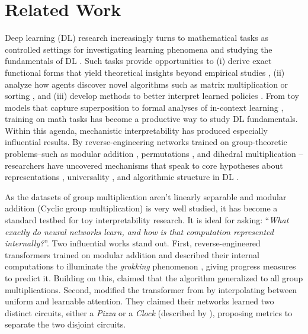 \documentclass{article} %
\theoremstyle{plain}
\theoremstyle{definition}
\newtheorem{empirical fact}[theorem]{Empirical Fact}
\begin{document}
\section{Related Work}
Deep learning (DL) research increasingly turns to mathematical tasks as controlled settings for investigating learning phenomena and studying the fundamentals of DL \citep{ghosh2025mathematical}. Such tasks provide opportunities to (i) derive exact functional forms that yield theoretical insights beyond empirical studies \citep{mccracken2021using}, (ii) analyze how agents discover novel algorithms such as matrix multiplication or sorting \citep{fawzi2022discovering, mankowitz2023faster}, and (iii) develop methods to better interpret learned policies \citep{raghu2018can}. From toy models that capture superposition \citep{elhage2022toy} to formal analyses of in-context learning \citep{lu2024context, lu2025asymptotic}, training on math tasks has become a productive way to study DL fundamentals. Within this agenda, mechanistic interpretability has produced especially influential results. By reverse-engineering networks trained on group-theoretic problems--such as modular addition \citep{nanda2023progress, chughtai2023toy, gromov2023grokking, morwani2024feature, mccracken2025uncoveringuniversalabstractalgorithm, yip2024modularadditionblackboxescompressing, he2024learning, tao2025how, doshi2023grok}, permutations \citep{standergrokking, wu2024towards}, and dihedral multiplication \cite{mccracken2025representations}--researchers have uncovered mechanisms that speak to core hypotheses about representations \citep{huh2024platonicrepresentationhypothesis}, universality \citep{olah2020zoom, li2015convergent}, and algorithmic structure in DL \citep{eberle2025position}.

As the datasets of group multiplication aren't linearly separable and modular addition (Cyclic group multiplication) is very well studied, it has become a standard testbed for toy interpretability research. It is ideal for asking: ``\textit{What exactly do neural networks learn, and how is that computation represented internally?}''. Two influential works stand out. First, \cite{nanda2023progress} reverse-engineered transformers trained on modular addition and described their internal computations to illuminate the \textit{grokking} phenomenon \citep{power2022grokkinggeneralizationoverfittingsmall}, giving progress measures to predict it. Building on this, \cite{chughtai2023toy} claimed that the algorithm generalized to all group multiplications. Second, \cite{zhong2023the} modified the transformer from \cite{nanda2023progress} by interpolating between uniform and learnable attention. They claimed their networks learned two distinct circuits, either a \textit{Pizza} or a \textit{Clock} (described by \cite{nanda2023progress}), proposing metrics to separate the two disjoint circuits.
\end{document}
